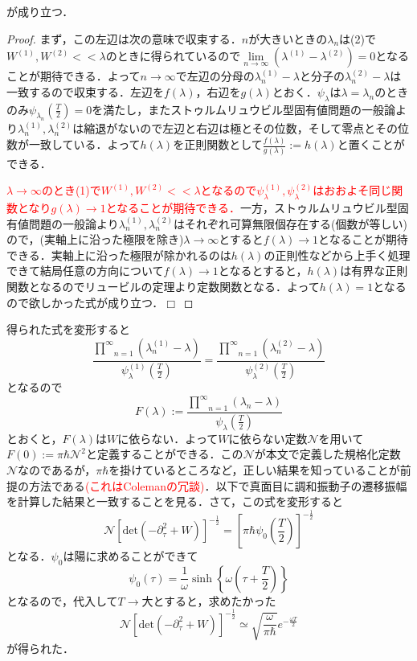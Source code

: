 \documentclass[a4paper,11pt]{jsarticle}
\newtheorem{proof}{証明}
\def\qed{\hfill $\Box$}
\begin{document}
が成り立つ．
\begin{proof}
まず，この左辺は次の意味で収束する．$n$が大きいときの$\lambda_n$は(2)で$W^{(1)},W^{(2)}<<\lambda$のときに得られているので$\underset{n\to\infty}{\lim}(\lambda^{(1)}-\lambda^{(2)})=0$となることが期待できる．よって$n\to\infty$で左辺の分母の$\lambda^{(1)}_n-\lambda$と分子の$\lambda^{(2)}_n-\lambda$は一致するので収束する．左辺を$f(\lambda)$，右辺を$g(\lambda)$とおく．$\psi_\lambda$は$\lambda=\lambda_n$のときのみ$\psi_{\lambda_n}\left(\frac{T}{2}\right)=0$を満たし，またストゥルムリュウビル型固有値問題の一般論より$\lambda^{(1)}_n,\lambda^{(2)}_n$は縮退がないので左辺と右辺は極とその位数，そして零点とその位数が一致している．よって$h(\lambda)$を正則関数として$\frac{f(\lambda)}{g(\lambda)}:=h(\lambda)$と置くことができる．\par
\textcolor{red}{$\lambda\to\infty$のとき(1)で$W^{(1)},W^{(2)}<<\lambda$となるので$\psi^{(1)}_\lambda,\psi^{(2)}_\lambda$はおおよそ同じ関数となり$g(\lambda)\to 1$となることが期待できる．}一方，ストゥルムリュウビル型固有値問題の一般論より$\lambda^{(1)}_n,\lambda^{(2)}_n$はそれぞれ可算無限個存在する(個数が等しい)ので，(実軸上に沿った極限を除き)$\lambda\to\infty$とすると$f(\lambda)\to 1$となることが期待できる．実軸上に沿った極限が除かれるのは$h(\lambda)$の正則性などから上手く処理できて結局任意の方向について$f(\lambda)\to 1$となるとすると，$h(\lambda)$は有界な正則関数となるのでリュービルの定理より定数関数となる．よって$h(\lambda)=1$となるので欲しかった式が成り立つ．\qed
\end{proof}
得られた式を変形すると
\begin{equation*}
\frac{\underset{n=1}{\overset{\infty}{\prod}} (\lambda^{(1)}_n-\lambda)}{\psi^{(1)}_\lambda\left(\frac{T}{2}\right)}=\frac{\underset{n=1}{\overset{\infty}{\prod}} (\lambda^{(2)}_n-\lambda)}{\psi^{(2)}_\lambda\left(\frac{T}{2}\right)}
\end{equation*}
となるので
\begin{equation*}
F(\lambda):=\frac{\underset{n=1}{\overset{\infty}{\prod}} (\lambda_n-\lambda)}{\psi_\lambda\left(\frac{T}{2}\right)}
\end{equation*}
とおくと，$F(\lambda)$は$W$に依らない．よって$W$に依らない定数$\mathcal{N}$を用いて$F(0):=\pi\hbar \mathcal{N}^2$と定義することができる．この$\mathcal{N}$が本文で定義した規格化定数$\mathcal{N}$なのであるが，$\pi\hbar$を掛けているところなど，正しい結果を知っていることが前提の方法である\textcolor{red}{(これはColemanの冗談)}．以下で真面目に調和振動子の遷移振幅を計算した結果と一致することを見る．さて，この式を変形すると
\begin{equation*}
\mathcal{N}[\mathrm{det}(-\partial_\tau^2+W)]^{-\frac{1}{2}}=\left[\pi\hbar\psi_0\left(\frac{T}{2}\right)\right]^{-\frac{1}{2}}
\end{equation*}
となる．$\psi_0$は陽に求めることができて
\begin{equation*}
\psi_0(\tau)=\frac{1}{\omega}\sinh{\left\{\omega\left(\tau+\frac{T}{2}\right)\right\}}
\end{equation*}
となるので，代入して$T\to$大とすると，求めたかった
\begin{equation*}
\mathcal{N}[\mathrm{det}(-\partial_\tau^2+W)]^{-\frac{1}{2}}\simeq\sqrt{\frac{\omega}{\pi\hbar}}e^{-\frac{\omega T}{2}}
\end{equation*}
が得られた．
%
%
%
\end{document}
